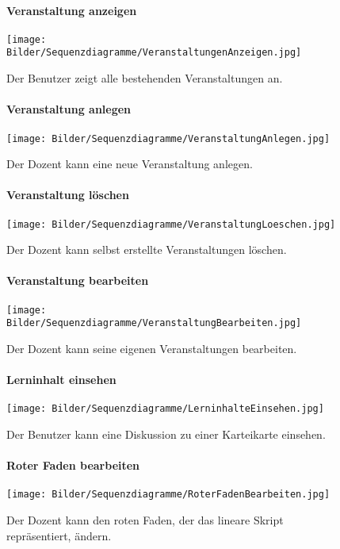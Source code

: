 \documentclass[12pt,a4paper]{article}
\begin{document}
\begin{figure}[H]
	\centering
	\paragraph{Veranstaltung anzeigen}
	\texttt{[image: Bilder/Sequenzdiagramme/VeranstaltungenAnzeigen.jpg]}
	\caption{Der Benutzer zeigt alle bestehenden Veranstaltungen an.}
	\label{SzVeranstaltungenAnzeigen}
\end{figure}
\begin{figure}[H]
	\centering
	\paragraph{Veranstaltung anlegen}
	\texttt{[image: Bilder/Sequenzdiagramme/VeranstaltungAnlegen.jpg]}
	\caption{Der Dozent kann eine neue Veranstaltung anlegen.}
	\label{SzVeranstaltungAnlegen}
\end{figure}
\begin{figure}[H]
	\centering
	\paragraph{Veranstaltung löschen}
	\texttt{[image: Bilder/Sequenzdiagramme/VeranstaltungLoeschen.jpg]}
	\caption{Der Dozent kann selbst erstellte Veranstaltungen löschen.}
	\label{SzVeranstaltungLoeschen}
\end{figure}
\begin{figure}[H]
	\centering
	\paragraph{Veranstaltung bearbeiten}
	\texttt{[image: Bilder/Sequenzdiagramme/VeranstaltungBearbeiten.jpg]}
	\caption{Der Dozent kann seine eigenen Veranstaltungen bearbeiten.}
	\label{SzVeranstaltungBearbeiten}
\end{figure}
\begin{figure}[H]
	\centering
	\paragraph{Lerninhalt einsehen}
	\texttt{[image: Bilder/Sequenzdiagramme/LerninhalteEinsehen.jpg]}
	\caption{Der Benutzer kann eine Diskussion zu einer Karteikarte einsehen.}
	\label{SzLerninhaltEinsehen}
\end{figure}
\begin{figure}[H]
	\centering
	\paragraph{Roter Faden bearbeiten}
	\texttt{[image: Bilder/Sequenzdiagramme/RoterFadenBearbeiten.jpg]}
	\caption{Der Dozent kann den roten Faden, der das lineare Skript repräsentiert, ändern.}
	\label{SzRoterFaden}
\end{figure}
\end{document}
